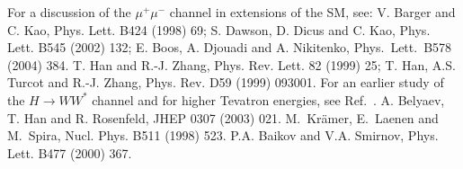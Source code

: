 \begin{thebibliography}{999}
 For a discussion of the $\mu^+ \mu^-$ 
channel in extensions of the SM, see:
V. Barger and C. Kao, Phys. Lett. B424 (1998) 69;
S. Dawson, D. Dicus and C. Kao, Phys. Lett. B545 (2002) 132; 
E. Boos, A. Djouadi and A. Nikitenko, Phys.\ Lett.\ B578 (2004) 384.
%
 T. Han and R.-J. Zhang, Phys. Rev. Lett. 82 (1999) 25;
T. Han, A.S. Turcot and R.-J. Zhang, Phys. Rev. D59 (1999) 093001. 
%
 For an earlier study of the $H \to WW^*$  channel and 
for higher Tevatron energies, see Ref.~\cite{Gunion-Han}.
%
 A. Belyaev, T. Han and R. Rosenfeld, JHEP 0307 (2003) 021. 
%
 M.\ Kr\"amer, E.\ Laenen and M.\ Spira, Nucl. Phys. B511
(1998) 523. 
%
 P.A. Baikov and V.A. Smirnov, Phys. Lett. B477
(2000) 367.   
%


\end{thebibliography}
